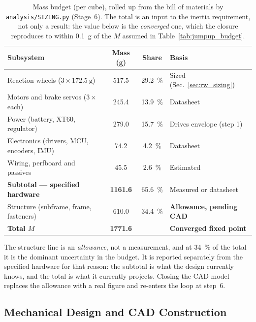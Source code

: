 \begin{table}[htbp]
\centering
\caption[Mass budget (per cube)]{Mass budget (per cube), rolled up from the bill of materials by
\texttt{analysis/SIZING.py} (Stage~6). The total is an input to the inertia
requirement, not only a result: the value below is the \emph{converged} one,
which the closure reproduces to within \qty{0.1}{\gram} of the $M$ assumed in
Table~\ref{tab:jumpup_budget}.}
\label{tab:massbudget}
\small
\begin{tabular}{l c c l}
\toprule
Subsystem & Mass (g) & Share & Basis \\
\midrule
Reaction wheels ($3\times\qty{172.5}{\gram}$) & 517.5 & \qty{29.2}{\percent} & Sized (Sec.~\ref{sec:rw_sizing}) \\
Motors and brake servos ($3\times$ each)      & 245.4 & \qty{13.9}{\percent} & Datasheet \\
Power (battery, XT60, regulator)              & 279.0 & \qty{15.7}{\percent} & Drives envelope (step 1) \\
Electronics (drivers, MCU, encoders, IMU)     &  74.2 & \qty{4.2}{\percent}  & Datasheet \\
Wiring, perfboard and passives                &  45.5 & \qty{2.6}{\percent}  & Estimated \\
\midrule
\textbf{Subtotal --- specified hardware}      & \textbf{1161.6} & \qty{65.6}{\percent} & Measured or datasheet \\
Structure (subframe, frame, fasteners)        & 610.0 & \qty{34.4}{\percent} & \textbf{Allowance, pending CAD} \\
\midrule
\textbf{Total $M$}                            & \textbf{1771.6} & & \textbf{Converged fixed point} \\
\bottomrule
\end{tabular}

\vspace{0.4em}
{\footnotesize\RaggedRight The structure line is an \emph{allowance}, not a
measurement, and at \qty{34}{\percent} of the total it is the dominant
uncertainty in the budget. It is reported separately from the specified
hardware for that reason: the subtotal is what the design currently knows, and
the total is what it currently projects. Closing the CAD model replaces the
allowance with a real figure and re-enters the loop at step~6.\par}
\end{table}

\subsection{Mechanical Design and CAD Construction}
\label{sec:mechanical}

